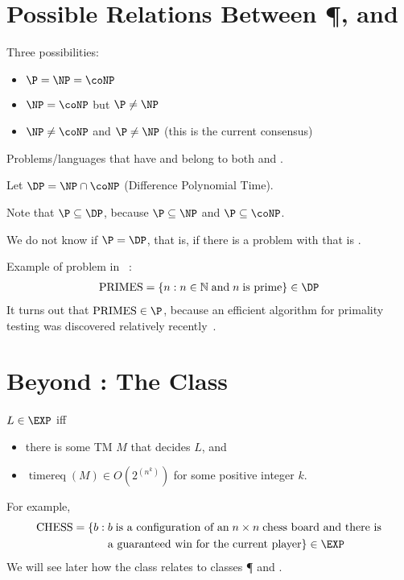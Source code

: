 \documentclass[a4paper]{report}
\newcommand{\bookref}[3]{\marginpar{\faBook{}~#1\\Chapter #2\\Section #3}}
\theoremstyle{definition}
\DeclareMathOperator*{\treq}{timereq}
\begin{document}
\section{Possible Relations Between \P, \NP{} and \coNP}
Three possibilities:
%
\begin{itemize}
\item $\P = \NP = \coNP$
\item $\NP = \coNP$ but $\P \neq \NP$
\item $\NP \neq \coNP$ and $\P \neq \NP$ (this is the current consensus)
\end{itemize}

Problems/languages that have  and  belong to both \NP{} and \coNP{}.

Let $\DP = \NP \cap \coNP$ (Difference Polynomial Time).

Note that $\P \subseteq \DP$, because $\P \subseteq \NP$ and $\P \subseteq \coNP$.

We do not know if $\P = \DP$, that is, if there is a problem with  that is .

Example of problem in \DP{}~\citep{pratt1975every}:
%
\begin{align*}
\text{PRIMES} = \{ n : n \in \mathbb{N} \;\text{and}\; n \;\text{is prime}\} \in \DP
\end{align*}
% 
It turns out that $\text{PRIMES} \in \P$, because an efficient algorithm for primality testing was discovered relatively recently~\citep{agrawal2004primes}.

\begin{center}
\scalebox{0.4}{}
\end{center}

\section{Beyond \NP: The Class \EXP}
\bookref{ER}{28}{28.9}
$L \in \EXP$ iff
\begin{itemize}
\item there is some TM $M$ that decides $L$, and
\item $\treq(M) \in O(2^{(n^k)})$ for some positive integer $k$.
\end{itemize}

For example,
%
\begin{align*}
\text{CHESS} = \{ b : &\; b \;\text{is a configuration of an} \; n \times n \;\text{chess board and there is}\\ & \;\text{a guaranteed win for the current player}\} \in \EXP
\end{align*}
%
We will see later how the class \EXP{} relates to classes \P{} and \NP{}.
\end{document}
